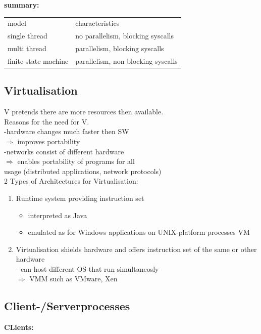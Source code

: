 \documentclass[ngerman,a4paper]{report}
\begin{document}
\textbf{summary:}\\
\begin{tabular}{l l}
model&characteristics\\
single thread& no parallelism, blocking syscalls\\
multi thread& parallelism, blocking syscalls\\
finite state machine& parallelism, non-blocking syscalls\\
\end{tabular}

\subsection{Virtualisation}

V pretends there are more resources then available.\\

Reasons for the need for V.\\
-hardware changes much faster then SW\\
$\Rightarrow$ improves portability\\
-networks consist of different hardware\\
$\Rightarrow$ enables portability of programs for all\\
usage (distributed applications, network protocols)\\

2 Types of Architectures for Virtualisation:\\
\begin{enumerate}
\item Runtime system providing instruction set\\
	\begin{itemize}
	\item interpreted as Java
	\item emulated as for Windows applications on UNIX-platform processes VM
	\end{itemize}
\item Virtualisation shields hardware and offers instruction set of the same or other hardware\\
- can host different OS that run simultaneosly\\
$\Rightarrow$ VMM such as VMware, Xen\\


\end{enumerate}


\subsection{Client-/Serverprocesses}
\textbf{CLients:}\\
\end{document}
